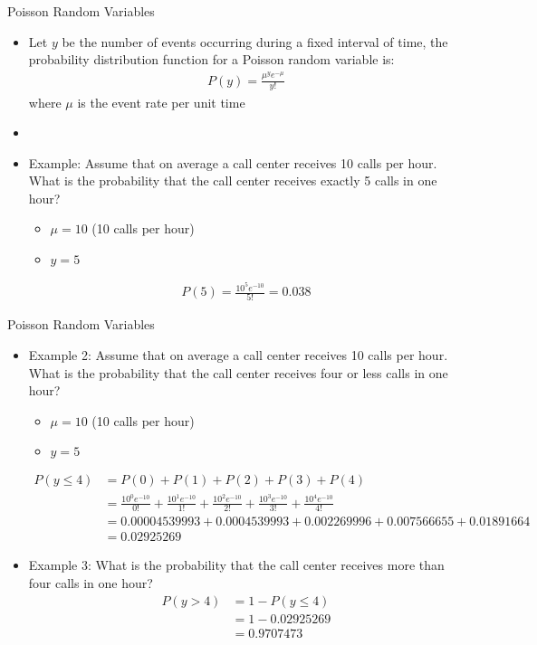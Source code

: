 \documentclass[xcolor=dvipsnames]{beamer}
\begin{document}
\begin{frame}{Poisson Random Variables}
	\begin{itemize}
		\item Let $y$ be the number of events occurring during a fixed interval of time, the probability distribution function for a Poisson random variable is: \pause
		\begin{gather*}
			P(y) = \frac{\mu ^ y e^{-\mu}}{y!}
		\end{gather*}
		where $\mu$ is the event rate per unit time \pause
		\item[]
		\item Example: Assume that on average a call center receives 10 calls per hour. What is the probability that the call center receives exactly 5 calls in one hour? \pause
		\begin{itemize}
			\item $\mu = 10$ (10 calls per hour) \pause
			\item $y = 5$ \pause
		\end{itemize}
		\begin{align*}
			P(5) = \frac{10^5 e^{-10}}{5!} = 0.038
		\end{align*}
	\end{itemize}
\end{frame}

\begin{frame}{Poisson Random Variables}
	\begin{itemize}
		\item Example 2: Assume that on average a call center receives 10 calls per hour. What is the probability that the call center receives four or less calls in one hour?
		\begin{itemize}
			\item $\mu = 10$ (10 calls per hour)
			\item $y = 5$
		\end{itemize}\pause
	{\scriptsize
		\begin{align*}
		P(y \leq 4) &= P(0) + P(1) + P(2) + P(3) + P(4) \\
		&= \frac{10^0 e^{-10}}{0!} + \frac{10^1 e^{-10}}{1!} + \frac{10^2 e^{-10}}{2!} + \frac{10^3 e^{-10}}{3!} + \frac{10^4 e^{-10}}{4!} \\
		&=  0.00004539993 + 0.0004539993 + 0.002269996 + 0.007566655 + 0.01891664 \\
		&= 0.02925269
		\end{align*}} \pause
	\item Example 3: What is the probability that the call center receives more than four calls in one hour?
	\begin{align*}
		P(y > 4) &= 1 - P(y \leq 4) \\
		&= 1- 0.02925269 \\
		&=  0.9707473
	\end{align*}
	\end{itemize}
\end{frame}
\end{document}

